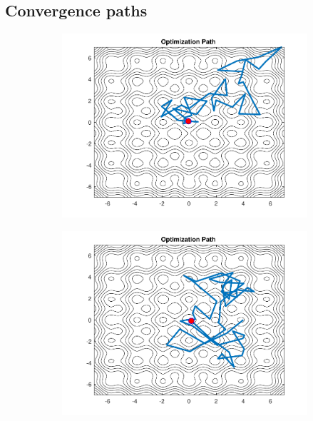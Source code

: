 \documentclass{article}
\begin{document}
\subsection{Convergence paths}
\begin{figure}[h]
\begin{subfigure}{0.3\textwidth}
\includegraphics[width=\linewidth]{path1}
\caption{}
\label{fig:path1}
\end{subfigure}
\begin{subfigure}{0.3\textwidth}
\includegraphics[width=\linewidth]{path2}
\caption{}
\label{fig:path2}
\end{subfigure}
\begin{subfigure}{0.3\textwidth}

\end{subfigure}
\end{figure}
\end{document}
